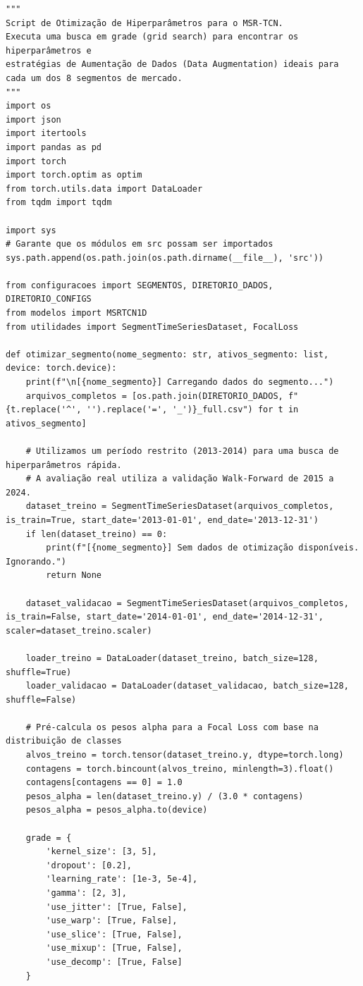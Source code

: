 \documentclass{article}
\begin{document}
\begin{verbatim}
"""
Script de Otimização de Hiperparâmetros para o MSR-TCN.
Executa uma busca em grade (grid search) para encontrar os hiperparâmetros e 
estratégias de Aumentação de Dados (Data Augmentation) ideais para cada um dos 8 segmentos de mercado.
"""
import os
import json
import itertools
import pandas as pd
import torch
import torch.optim as optim
from torch.utils.data import DataLoader
from tqdm import tqdm

import sys
# Garante que os módulos em src possam ser importados
sys.path.append(os.path.join(os.path.dirname(__file__), 'src'))

from configuracoes import SEGMENTOS, DIRETORIO_DADOS, DIRETORIO_CONFIGS
from modelos import MSRTCN1D
from utilidades import SegmentTimeSeriesDataset, FocalLoss

def otimizar_segmento(nome_segmento: str, ativos_segmento: list, device: torch.device):
    print(f"\n[{nome_segmento}] Carregando dados do segmento...")
    arquivos_completos = [os.path.join(DIRETORIO_DADOS, f"{t.replace('^', '').replace('=', '_')}_full.csv") for t in ativos_segmento]
    
    # Utilizamos um período restrito (2013-2014) para uma busca de hiperparâmetros rápida.
    # A avaliação real utiliza a validação Walk-Forward de 2015 a 2024.
    dataset_treino = SegmentTimeSeriesDataset(arquivos_completos, is_train=True, start_date='2013-01-01', end_date='2013-12-31')
    if len(dataset_treino) == 0:
        print(f"[{nome_segmento}] Sem dados de otimização disponíveis. Ignorando.")
        return None
        
    dataset_validacao = SegmentTimeSeriesDataset(arquivos_completos, is_train=False, start_date='2014-01-01', end_date='2014-12-31', scaler=dataset_treino.scaler)
    
    loader_treino = DataLoader(dataset_treino, batch_size=128, shuffle=True)
    loader_validacao = DataLoader(dataset_validacao, batch_size=128, shuffle=False)
        
    # Pré-calcula os pesos alpha para a Focal Loss com base na distribuição de classes
    alvos_treino = torch.tensor(dataset_treino.y, dtype=torch.long)
    contagens = torch.bincount(alvos_treino, minlength=3).float()
    contagens[contagens == 0] = 1.0
    pesos_alpha = len(dataset_treino.y) / (3.0 * contagens)
    pesos_alpha = pesos_alpha.to(device)
        
    grade = {
        'kernel_size': [3, 5],
        'dropout': [0.2],
        'learning_rate': [1e-3, 5e-4],
        'gamma': [2, 3],
        'use_jitter': [True, False],
        'use_warp': [True, False],
        'use_slice': [True, False],
        'use_mixup': [True, False],
        'use_decomp': [True, False]
    }
    

\end{verbatim}
\end{document}
